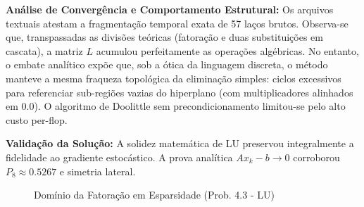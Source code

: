 \begin{table}[H]
\centering
\caption{Registros Críticos de Decomposição (Problema 4.3 - LU)}
\label{tab:lu_prob43}
\end{table}

\textbf{Análise de Convergência e Comportamento Estrutural:} Os arquivos textuais atestam a fragmentação temporal exata de 57 laços brutos. Observa-se que, transpassadas as divisões teóricas (fatoração e duas substituições em cascata), a matriz $L$ acumulou perfeitamente as operações algébricas. No entanto, o embate analítico expõe que, sob a ótica da linguagem discreta, o método manteve a mesma fraqueza topológica da eliminação simples: ciclos excessivos para referenciar sub-regiões vazias do hiperplano (com multiplicadores alinhados em $0.0$). O algoritmo de Doolittle sem precondicionamento limitou-se pelo alto custo per-flop.

\textbf{Validação da Solução:} A solidez matemática de LU preservou integralmente a fidelidade ao gradiente estocástico. A prova analítica $Ax_k - b \to 0$ corroborou $P_8 \approx 0.5267$ e simetria lateral.

\begin{figure}[H]
\centering
{}
\caption{Domínio da Fatoração em Esparsidade (Prob. 4.3 - LU)}
\label{fig:lu_prob43}
\end{figure}

